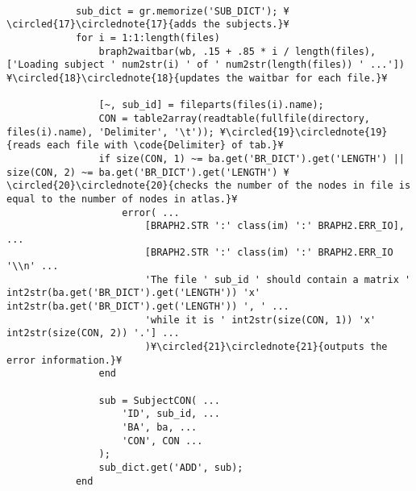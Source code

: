 \documentclass{tufte-handout}
\begin{document}
\begin{lstlisting}
            
            sub_dict = gr.memorize('SUB_DICT'); ¥\circled{17}\circlednote{17}{adds the subjects.}¥
            for i = 1:1:length(files)
                braph2waitbar(wb, .15 + .85 * i / length(files), ['Loading subject ' num2str(i) ' of ' num2str(length(files)) ' ...']) ¥\circled{18}\circlednote{18}{updates the waitbar for each file.}¥

                [~, sub_id] = fileparts(files(i).name);
                CON = table2array(readtable(fullfile(directory, files(i).name), 'Delimiter', '\t')); ¥\circled{19}\circlednote{19}{reads each file with \code{Delimiter} of tab.}¥
                if size(CON, 1) ~= ba.get('BR_DICT').get('LENGTH') || size(CON, 2) ~= ba.get('BR_DICT').get('LENGTH') ¥\circled{20}\circlednote{20}{checks the number of the nodes in file is equal to the number of nodes in atlas.}¥
                    error( ...
                        [BRAPH2.STR ':' class(im) ':' BRAPH2.ERR_IO], ...
                        [BRAPH2.STR ':' class(im) ':' BRAPH2.ERR_IO '\\n' ...
                        'The file ' sub_id ' should contain a matrix ' int2str(ba.get('BR_DICT').get('LENGTH')) 'x' int2str(ba.get('BR_DICT').get('LENGTH')) ', ' ...
                        'while it is ' int2str(size(CON, 1)) 'x' int2str(size(CON, 2)) '.'] ...
                        )¥\circled{21}\circlednote{21}{outputs the error information.}¥
                end
                
                sub = SubjectCON( ...
                    'ID', sub_id, ...
                    'BA', ba, ...
                    'CON', CON ...
                );
                sub_dict.get('ADD', sub);
            end
            

\end{lstlisting}
\end{document}
